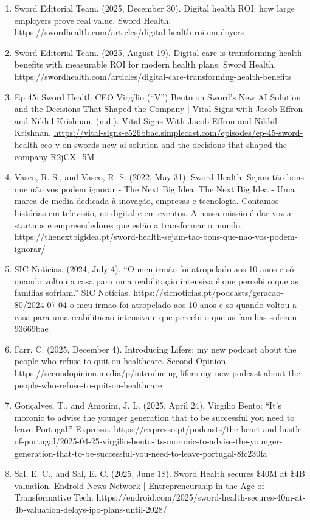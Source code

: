 \documentclass[12pt]{article}
\begin{document}
\begin{enumerate}
    \item Sword Editorial Team. (2025, December 30). Digital health ROI: how large employers prove real value. Sword Health. https://swordhealth.com/articles/digital-health-roi-employers
    \item Sword Editorial Team. (2025, August 19). Digital care is transforming health benefits with measurable ROI for modern health plans. Sword Health. https://swordhealth.com/articles/digital-care-transforming-health-benefits
    \item Ep 45: Sword Health CEO Virgílio (“V”) Bento on Sword’s New AI Solution and the Decisions That Shaped the Company | Vital Signs with Jacob Effron and Nikhil Krishnan. (n.d.). Vital Signs With Jacob Effron and Nikhil Krishnan. \url{https://vital-signs-e526bbac.simplecast.com/episodes/ep-45-sword-health-ceo-v-on-swords-new-ai-solution-and-the-decisions-that-shaped-the-company-R2jCX_5M}
    \item Vasco, R. S., and Vasco, R. S. (2022, May 31). Sword Health. Sejam tão bons que não vos podem ignorar - The Next Big Idea. The Next Big Idea - Uma marca de media dedicada à inovação, empresas e tecnologia. Contamos histórias em televisão, no digital e em eventos. A nossa missão é dar voz a startups e empreendedores que estão a transformar o mundo. https://thenextbigidea.pt/sword-health-sejam-tao-bons-que-nao-vos-podem-ignorar/
    \item SIC Notícias. (2024, July 4). “O meu irmão foi atropelado aos 10 anos e só quando voltou a casa para uma reabilitação intensiva é que percebi o que as famílias sofriam.” SIC Notícias. https://sicnoticias.pt/podcasts/geracao-80/2024-07-04-o-meu-irmao-foi-atropelado-aos-10-anos-e-so-quando-voltou-a-casa-para-uma-reabilitacao-intensiva-e-que-percebi-o-que-as-familias-sofriam-93669bae
    \item Farr, C. (2025, December 4). Introducing Lifers: my new podcast about the people who refuse to quit on healthcare. Second Opinion. https://secondopinion.media/p/introducing-lifers-my-new-podcast-about-the-people-who-refuse-to-quit-on-healthcare
    \item Gonçalves, T., and Amorim, J. L. (2025, April 24). Virgílio Bento‌:‌ “It’s moronic to advise the younger generation that to be successful you need to leave Portugal.” Expresso. https://expresso.pt/podcasts/the-heart-and-hustle-of-portugal/2025-04-25-virgilio-bento-its-moronic-to-advise-the-younger-generation-that-to-be-successful-you-need-to-leave-portugal-8fc230fa
    \item Sal, E. C., and Sal, E. C. (2025, June 18). Sword Health secures \$40M at \$4B valuation. Endroid News Network | Entrepreneurship in the Age of Transformative Tech. https://endroid.com/2025/sword-health-secures-40m-at-4b-valuation-delays-ipo-plans-until-2028/

\end{enumerate}
\end{document}
